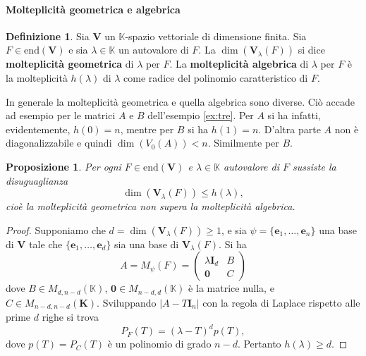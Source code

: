 \documentclass{article}
\theoremstyle{plain}
\newtheorem{prop}[thm]{Proposizione}
\theoremstyle{definition}
\newtheorem{defn}{Definizione}[section]
\theoremstyle{remark}
\begin{document}
\vspace{10pt}

\paragraph{Molteplicità geometrica e algebrica}
\begin{bxthm}
\begin{defn}
Sia $\mathbf{V}$ un $\mathbb{K}$-spazio vettoriale di dimensione finita. Sia $F \in \mathrm{end}(\mathbf{V})$ e sia $\lambda \in \mathbb{K}$ un 
autovalore di $F$. La $\dim(\mathbf{V}_\lambda(F))$ si dice \textbf{molteplicità geometrica} di $\lambda$ per $F$. 
La \textbf{molteplicità algebrica} di $\lambda$ per $F$ è la molteplicità $h(\lambda)$ di $\lambda$ come 
radice del polinomio caratteristico di $F$.    
\end{defn}
\end{bxthm}

\vspace{10pt}

In generale la molteplicità geometrica e quella algebrica sono diverse. 
Ciò accade ad esempio per le matrici $A$ e $B$ dell'esempio \ref{ex:tre}. 
Per $A$ si ha infatti, evidentemente, $h(0) = n$, mentre per $B$ si ha $h(1) = n$. 
D'altra parte $A$ non è diagonalizzabile e quindi $\dim(V_0(A)) < n$. Similmente per $B$.

\vspace{10pt}

\begin{bxthm}
\begin{prop}
Per ogni $F \in \mathrm{end}(\mathbf{V})$ e $\lambda \in \mathbb{K}$ autovalore di $F$ sussiste la disuguaglianza
\begin{equation}\label{tredicidodicii}
\dim(\mathbf{V}_\lambda(F)) \leq h(\lambda),    
\end{equation}
cioè la molteplicità geometrica non supera la molteplicità algebrica.    
\end{prop}    
\end{bxthm}
\begin{proof}
Supponiamo che $d = \dim(\mathbf{V}_\lambda(F)) \geq 1$, e sia $\psi=\{\mathbf{e}_1, \dots, \mathbf{e}_n\}$ una 
base di $\mathbf{V}$ tale che $\{\mathbf{e}_1, \dots, \mathbf{e}_d\}$ sia una base di $\mathbf{V}_\lambda(F)$. 
Si ha
\[
A = M_\psi(F) = \begin{pmatrix}
\lambda \mathbf{I}_d & B \\
\mathbf{0} & C
\end{pmatrix}
\]
dove $B \in M_{d, n-d}(\mathbb{K})$, $\mathbf{0} \in M_{n-d,d}(\mathbb{K})$ è la matrice nulla, e 
$C \in M_{n-d, n-d}(\mathbf{K})$. Sviluppando $|A - T \mathbf{I}_n|$ con la regola di Laplace rispetto 
alle prime $d$ righe si trova
\[
P_F(T) = (\lambda - T)^d p(T),
\]
dove $p(T) = P_C(T)$ è un polinomio di grado $n - d$. Pertanto $h(\lambda) \geq d$.    
\end{proof}
\end{document}
